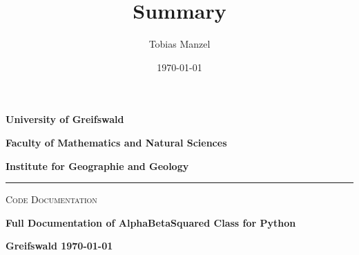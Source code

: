 \documentclass[
	ngerman,							%
	a4paper,							%
	11pt,							%
	oneside							%
	]{article}							%
\title{Summary}  								%
\author{Tobias Manzel} 							%
\date{\today}										%
\begin{document}
\begin{titlepage}
\centering


	{\bfseries\large University of Greifswald \par}
	{\bfseries\large Faculty of Mathematics and Natural Sciences \par}
	{\bfseries\large Institute for Geographie and Geology \par}
	\vspace{0.25cm}
    {\rule{15cm}{0.4pt} \par}
	\vspace{0.5cm}
	{\scshape\large Code Documentation\par}
	\vspace{0.25cm}
	{\Large\bfseries Full Documentation of AlphaBetaSquared Class
          for Python\par}
	\vspace{1cm}
	{\Large\bfseries Greifswald \today \par}
	\vspace{2cm}
    	\vspace{6cm}
\end{titlepage}

\newpage
{}
\thispagestyle{empty}
\tableofcontents
\newpage
\end{document}
